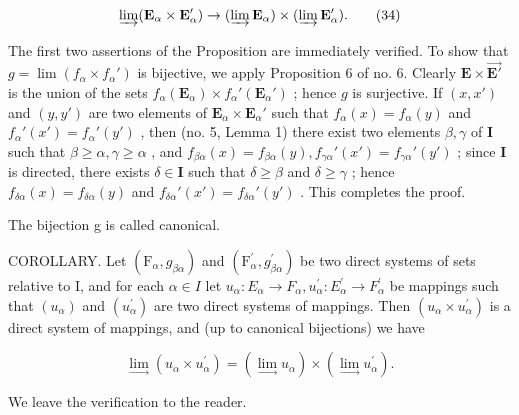 \[
\varinjlim (\mathbf {E} _ {\alpha} \times \mathbf {E} _ {\alpha} ^ {\prime}) \rightarrow (\varinjlim \mathbf {E} _ {\alpha}) \times (\varinjlim \mathbf {E} _ {\alpha} ^ {\prime}).\tag{34}
\]

The first two assertions of the Proposition are immediately verified. To show that \(g = \lim (f_{\alpha} \times f_{\alpha}')\) is bijective, we apply Proposition 6 of no. 6. Clearly \(\mathbf{E} \times \overrightarrow{\mathbf{E}'}\) is the union of the sets \(f_{\alpha}(\mathbf{E}_{\alpha}) \times f_{\alpha}'(\mathbf{E}_{\alpha}')\) ; hence \(g\) is surjective. If \((x, x')\) and \((y, y')\) are two elements of \(\mathbf{E}_{\alpha} \times \mathbf{E}_{\alpha}'\) such that \(f_{\alpha}(x) = f_{\alpha}(y)\) and \(f_{\alpha}'(x') = f_{\alpha}'(y')\) , then (no. 5, Lemma 1) there exist two elements \(\beta, \gamma\) of \(\mathbf{I}\) such that \(\beta \geqslant \alpha, \gamma \geqslant \alpha\) , and \(f_{\beta \alpha}(x) = f_{\beta \alpha}(y), f_{\gamma \alpha}'(x') = f_{\gamma \alpha}'(y')\) ; since \(\mathbf{I}\) is directed, there exists \(\delta \in \mathbf{I}\) such that \(\delta \geqslant \beta\) and \(\delta \geqslant \gamma\) ; hence \(f_{\delta \alpha}(x) = f_{\delta \alpha}(y)\) and \(f_{\delta \alpha}'(x') = f_{\delta \alpha}'(y')\) . This completes the proof.

The bijection g is called canonical.

COROLLARY. Let \((\mathrm{F}_{\alpha}, g_{\beta\alpha})\) and \((\mathrm{F}_{\alpha}^{\prime}, g_{\beta\alpha}^{\prime})\) be two direct systems of sets relative to I, and for each \(\alpha \in I\) let \(u_{\alpha}: E_{\alpha} \to F_{\alpha}, u_{\alpha}^{\prime}: E_{\alpha}^{\prime} \to F_{\alpha}^{\prime}\) be mappings such that \((u_{\alpha})\) and \((u_{\alpha}^{\prime})\) are two direct systems of mappings. Then \((u_{\alpha} \times u_{\alpha}^{\prime})\) is a direct system of mappings, and (up to canonical bijections) we have

\[
\lim _ {\rightarrow} \left(u _ {\alpha} \times u _ {\alpha} ^ {\prime}\right) = (\lim _ {\rightarrow} u _ {\alpha}) \times (\lim _ {\rightarrow} u _ {\alpha} ^ {\prime}).\tag{35}
\]

We leave the verification to the reader.

\startexercises

\exercisegroup


